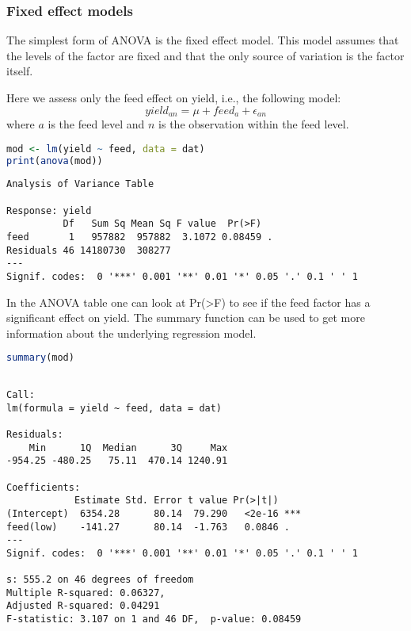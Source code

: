 \subsubsection{Fixed effect models}\label{fixed-effect-models}

The simplest form of ANOVA is the fixed effect model. This model assumes
that the levels of the factor are fixed and that the only source of
variation is the factor itself.

\label{one-way-anova}

Here we assess only the feed effect on yield, i.e., the following model:
\[yield_{an} = \mu + feed_a + \epsilon_{an}\] where \(a\) is the feed
level and \(n\) is the observation within the feed level.

\begin{lstlisting}[language=R, columns=fullflexible, basicstyle=\linespread{0.85}\small\ttfamily, stringstyle=\color{DarkGreen}, keywordstyle=\color{blue}, commentstyle=\color{DarkGreen},]
mod <- lm(yield ~ feed, data = dat)
print(anova(mod))
\end{lstlisting}
\begin{Verbatim}[fontsize=\small]
Analysis of Variance Table

Response: yield
          Df   Sum Sq Mean Sq F value  Pr(>F)
feed       1   957882  957882  3.1072 0.08459 .
Residuals 46 14180730  308277
---
Signif. codes:  0 '***' 0.001 '**' 0.01 '*' 0.05 '.' 0.1 ' ' 1
\end{Verbatim}

In the ANOVA table one can look at Pr(\textgreater F) to see if the feed
factor has a significant effect on yield. The summary function can be
used to get more information about the underlying regression model.

\begin{lstlisting}[language=R, columns=fullflexible, basicstyle=\linespread{0.85}\small\ttfamily, stringstyle=\color{DarkGreen}, keywordstyle=\color{blue}, commentstyle=\color{DarkGreen},]
summary(mod)
\end{lstlisting}
\begin{Verbatim}[fontsize=\small]

Call:
lm(formula = yield ~ feed, data = dat)

Residuals:
    Min      1Q  Median      3Q     Max
-954.25 -480.25   75.11  470.14 1240.91

Coefficients:
            Estimate Std. Error t value Pr(>|t|)
(Intercept)  6354.28      80.14  79.290   <2e-16 ***
feed(low)    -141.27      80.14  -1.763   0.0846 .
---
Signif. codes:  0 '***' 0.001 '**' 0.01 '*' 0.05 '.' 0.1 ' ' 1

s: 555.2 on 46 degrees of freedom
Multiple R-squared: 0.06327,
Adjusted R-squared: 0.04291
F-statistic: 3.107 on 1 and 46 DF,  p-value: 0.08459
\end{Verbatim}


